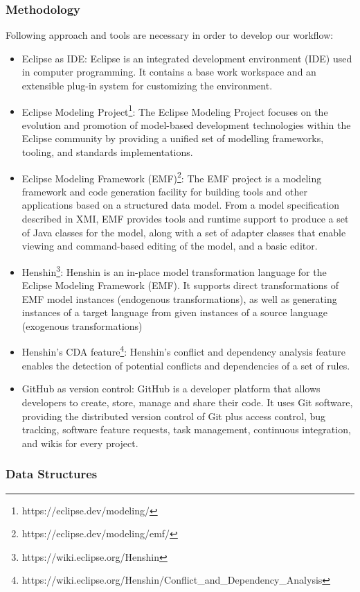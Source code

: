 \subsubsection*{Methodology}
Following approach and tools are necessary in order to develop our workflow:
\begin{itemize}
	\item Eclipse as IDE: Eclipse is an integrated development environment (IDE) used in computer programming. It contains a base work workspace and an extensible plug-in system for customizing the environment.
	\item Eclipse Modeling Project\footnote{https://eclipse.dev/modeling/}: The Eclipse Modeling Project focuses on the evolution and promotion of model-based development technologies within the Eclipse community by providing a unified set of modelling frameworks, tooling, and standards implementations.
	\item Eclipse Modeling Framework (EMF)\footnote{https://eclipse.dev/modeling/emf/}: The EMF project is a modeling framework and code generation facility for building tools and other applications based on a structured data model. From a model specification described in XMI, EMF provides tools and runtime support to produce a set of Java classes for the model, along with a set of adapter classes that enable viewing and command-based editing of the model, and a basic editor.
	\item Henshin\footnote{https://wiki.eclipse.org/Henshin}: Henshin is an in-place model transformation language for the Eclipse Modeling Framework (EMF). It supports direct transformations of EMF model instances (endogenous transformations), as well as generating instances of a target language from given instances of a source language (exogenous transformations)
	\item Henshin's CDA feature\footnote{https://wiki.eclipse.org/Henshin/Conflict\_and\_Dependency\_Analysis}: Henshin's conflict and dependency analysis feature enables the detection of potential conflicts and dependencies of a set of rules.
	\item GitHub as version control: GitHub is a developer platform that allows developers to create, store, manage and share their code. It uses Git software, providing the distributed version control of Git plus access control, bug tracking, software feature requests, task management, continuous integration, and wikis for every project.
\end{itemize} 
\subsubsection*{Data Structures}

